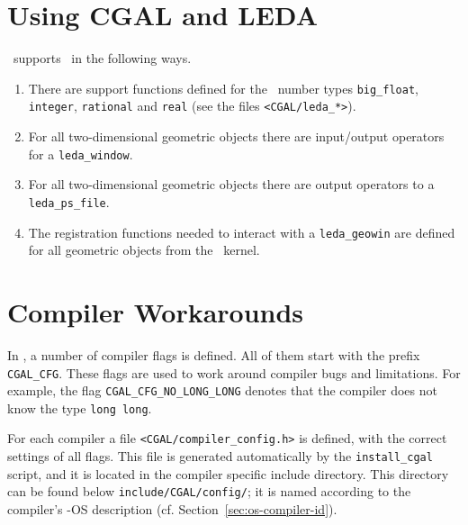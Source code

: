 
\section{Using CGAL and LEDA\label{sec:leda}}
\cgal\ supports \leda\ in the following ways.

\begin{enumerate}
\item There are support functions defined for the \leda\ number types
  \texttt{big\_float}, \texttt{integer}, \texttt{rational} and
  \texttt{real} (see the files \texttt{<CGAL/leda\_*>}).
\item For all two-dimensional geometric objects there are input/output
  operators for a \texttt{leda\_window}.
\item For all two-dimensional geometric objects there are output
  operators to a \texttt{leda\_ps\_file}.
\item The registration functions needed to interact with a
  \texttt{leda\_geowin} are defined for all geometric objects from the
  \cgal\ kernel.
\end{enumerate}

\section{Compiler Workarounds}

In \cgal, a number of compiler flags is defined. All of them start
with the prefix \texttt{CGAL\_CFG}. These flags are used to work
around compiler bugs and limitations. For example, the flag
\texttt{CGAL\_CFG\_NO\_LONG\_LONG} denotes that the compiler does not
know the type \texttt{long long}.

For each compiler a file \texttt{<CGAL/compiler\_config.h>}
 is defined, with the correct
settings of all flags. This file is generated automatically by the
\texttt{install\_cgal} script, and it is located in the compiler
specific include directory. This directory can be found below
\texttt{include/CGAL/config/};
 it is named according to the compiler's \cgal-OS
description (cf. Section~\ref{sec:os-compiler-id}).

